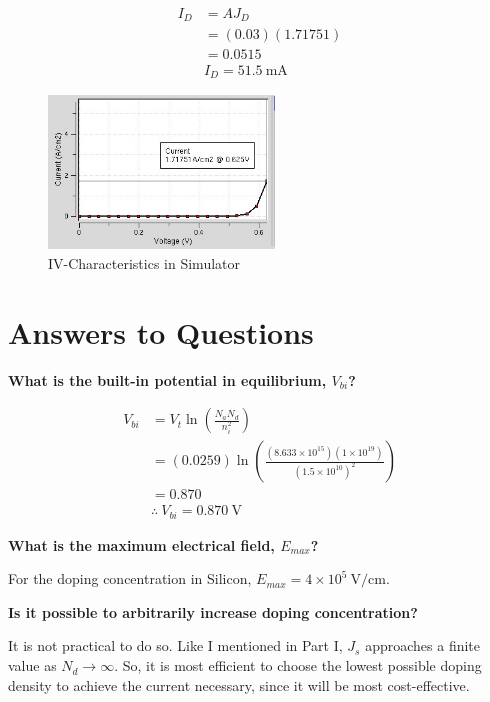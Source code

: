 \documentclass{IEEEtran}
\begin{document}
\begin{align*}
    I_D &= AJ_D \\
        &= (0.03)(1.71751) \\
        &= 0.0515 \\
        & \boxed{I_D = 51.5 ~ \text{mA}}
\end{align*}

\begin{figure}[!ht] 
    \centering
    \includegraphics[width = 6cm]{current.jpg}
    \caption{IV-Characteristics in Simulator}
    \label{fig:current}
\end{figure}

\section*{Answers to Questions}

\textbf{What is the built-in potential in equilibrium, \(V_{bi}\)?}

\begin{align*}
    V_{bi} &= V_t \ln \left( \frac{N_a N_d}{n_i^2}  \right) \\
           &= (0.0259)\ln \left( \frac{(8.633\times10^{15})(1\times10^{19})}{(1.5\times10^{10})^2}  \right) \\ 
           &= 0.870 \\
           & \therefore ~ \boxed{V_{bi} = 0.870~\text{V}}
\end{align*}

\textbf{What is the maximum electrical field, \(E_{max}\)?}

For the doping concentration in Silicon, \(E_{max} = 4\times10^5 ~ \text{V}/\text{cm}\).

\textbf{Is it possible to arbitrarily increase doping concentration?}

It is not practical to do so. Like I mentioned in Part I, \(J_s\) approaches a finite value as \(N_d \to \infty\). So, it is most efficient to choose the lowest possible doping density to achieve the current necessary, since it will be most cost-effective.
\end{document}
